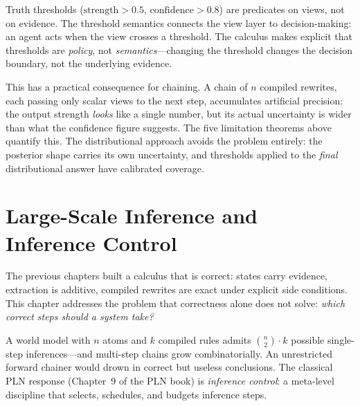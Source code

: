 \documentclass[11pt,openany]{report}
\begin{document}
Truth thresholds ($\mathrm{strength} > 0.5$,
$\mathrm{confidence} > 0.8$) are predicates on views, not on
evidence.  The threshold semantics connects the view layer to
decision-making: an agent acts when the view crosses a threshold.
The calculus makes explicit that thresholds are \emph{policy}, not
\emph{semantics}---changing the threshold changes the decision
boundary, not the underlying evidence.

This has a practical consequence for chaining.  A chain of $n$
compiled rewrites, each passing only scalar views to the next step,
accumulates artificial precision: the output strength \emph{looks}
like a single number, but its actual uncertainty is wider than
what the confidence figure suggests.  The five limitation theorems
above quantify this.  The distributional approach avoids the
problem entirely: the posterior shape carries its own uncertainty,
and thresholds applied to the \emph{final} distributional answer
have calibrated coverage.



\chapter{Large-Scale Inference and Inference Control}
\label{ch:scale-control}

The previous chapters built a calculus that is correct: states carry
evidence, extraction is additive, compiled rewrites are exact under
explicit side conditions.  This chapter addresses the problem that
correctness alone does not solve: \emph{which correct steps should a
system take?}

A world model with $n$ atoms and $k$ compiled rules admits
$\binom{n}{2} \cdot k$ possible single-step inferences---and
multi-step chains grow combinatorially.  An unrestricted forward
chainer would drown in correct but useless conclusions.  The
classical PLN response (Chapter~9 of the PLN book) is
\emph{inference control}: a meta-level discipline that selects,
schedules, and budgets inference steps.
\end{document}
